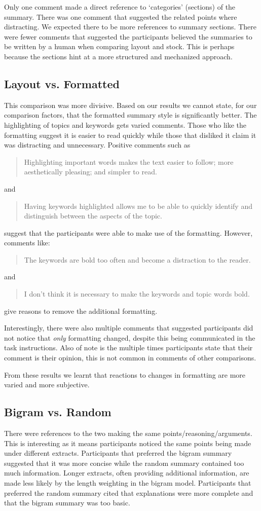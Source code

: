       Only one comment made a direct reference to `categories' (sections) of the summary. There was one comment that suggested the related points where distracting. We expected there to be more references to summary sections. There were fewer comments that suggested the participants believed the summaries to be written by a human when comparing layout and stock. This is perhaps because the sections hint at a more structured and mechanized approach.

    \tocless\subsection{Layout vs. Formatted}
      This comparison was more divisive. Based on our results we cannot state, for our comparison factors, that the formatted summary style is significantly better. The highlighting of topics and keywords gets varied comments. Those who like the formatting suggest it is easier to read quickly while those that disliked it claim it was distracting and unnecessary. Positive comments such as \blockquote{Highlighting important words makes the text easier to follow; more aesthetically pleasing; and simpler to read.} and \blockquote{Having keywords highlighted allows me to be able to quickly identify and distinguish between the aspects of the topic.} suggest that the participants were able to make use of the formatting. However, comments like: \blockquote{The keywords are bold too often and become a distraction to the reader.} and \blockquote{I don't think it is necessary to make the keywords and topic words bold.} give reasons to remove the additional formatting.

      Interestingly, there were also multiple comments that suggested participants did not notice that \textit{only} formatting changed, despite this being communicated in the task instructions. Also of note is the multiple times participants state that their comment is their opinion, this is not common in comments of other comparisons.

      From these results we learnt that reactions to changes in formatting are more varied and more subjective.

    \tocless\subsection{Bigram vs. Random}
      There were references to the two making the same points/reasoning/arguments. This is interesting as it means participants noticed the same points being made under different extracts. Participants that preferred the bigram summary suggested that it was more concise while the random summary contained too much information. Longer extracts, often providing additional information, are made less likely by the length weighting in the bigram model. Participants that preferred the random summary cited that explanations were more complete and that the bigram summary was too basic.

